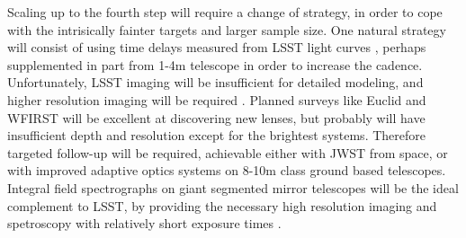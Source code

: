 Scaling up to the fourth step will require a change of strategy, in
order to cope with the intrisically fainter targets and larger sample
size. One natural strategy will consist of using time delays measured
from LSST light curves \citep{LiaoEtal2015}, perhaps supplemented in
part from 1-4m telescope in order to increase the
cadence. Unfortunately, LSST imaging will be insufficient for detailed
modeling, and higher resolution imaging will be required
\citep{Men++15}. 
Planned surveys like Euclid and WFIRST will be excellent at
discovering new lenses, but probably will have insufficient depth and
resolution except for the brightest systems. Therefore targeted
follow-up will be required, achievable either with JWST from space, or
with improved adaptive optics systems on 8-10m class ground based
telescopes. Integral field spectrographs on giant segmented mirror
telescopes will be the ideal complement to LSST, by providing the
necessary high resolution imaging and spetroscopy with relatively
short exposure times
\citep[e.g.][]{Ski++15}.

